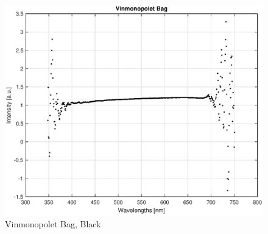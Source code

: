 \begin{appendices}
\begin{figure}
    \centering
    \includegraphics[width = 12cm]{Images/appendix/vinmono.eps}
    \caption[$\; \:$Vinmonopolet Bag]{Vinmonopolet Bag, Black}
    \label{fig:vinmono}
\end{figure}





\end{appendices}




